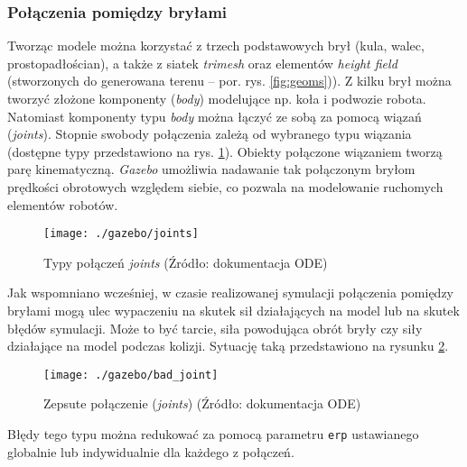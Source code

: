 	\subsubsection{Połączenia pomiędzy bryłami \label{subsubsec:joints}}
	Tworząc modele można korzystać z trzech podstawowych brył (kula, walec, prostopadłościan), a także z siatek \textit{trimesh} oraz elementów \textit{height field} (stworzonych do generowana terenu -- por. rys. \ref{fig:geoms})).
	Z kilku brył można tworzyć złożone komponenty (\textit{body}) modelujące np. koła i podwozie robota. Natomiast komponenty typu \textit{body} można łączyć ze sobą za pomocą wiązań (\textit{joints}).
	Stopnie swobody połączenia zależą od wybranego typu wiązania (dostępne typy przedstawiono na rys. \ref{fig:joints}). Obiekty połączone wiązaniem tworzą parę kinematyczną.
	\textit{Gazebo} umożliwia nadawanie tak połączonym bryłom prędkości obrotowych względem siebie, co pozwala na modelowanie ruchomych elementów robotów.
	\begin{figure}[H]
	\centering
	\texttt{[image: ./gazebo/joints]}
	\caption{Typy połączeń \textit{joints} (Źródło: dokumentacja ODE) \label{fig:joints}}
	\end{figure}
	Jak wspomniano wcześniej, w czasie realizowanej symulacji połączenia pomiędzy bryłami mogą ulec wypaczeniu na skutek sił działających na model lub na skutek błędów symulacji. Może to być tarcie,
	siła powodująca obrót bryły czy siły działające na model podczas kolizji. Sytuację taką przedstawiono na rysunku \ref{fig:bad_joint}.
	\begin{figure}[H]
	\centering
	\texttt{[image: ./gazebo/bad\_joint]}
	\caption{Zepsute połączenie (\textit{joints}) (Źródło: dokumentacja ODE) \label{fig:bad_joint}}
	\end{figure}
	Błędy tego typu można redukować za pomocą parametru \texttt{erp} ustawianego globalnie lub indywidualnie dla każdego z połączeń.
